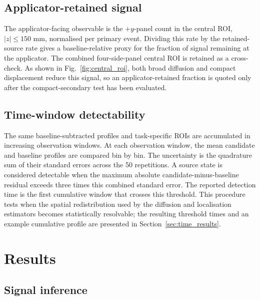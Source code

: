 \documentclass{iopconfser}
\begin{document}
\subsection{Applicator-retained signal}

The applicator-facing observable is the \(+y\)-panel count in the central
ROI, \(|z|\leq150\) mm, normalised per primary event. Dividing this rate by
the retained-source rate gives a baseline-relative proxy for the fraction of
signal remaining at the applicator. The combined four-side-panel central ROI is retained as a
cross-check. As shown in Fig.~\ref{fig:central_roi}, both broad diffusion and
compact displacement reduce this signal, so an applicator-retained fraction
is quoted only after the compact-secondary test has been evaluated.


\subsection{Time-window detectability}

The same baseline-subtracted profiles and task-specific ROIs are accumulated
in increasing observation windows. At each observation window, the mean
candidate and baseline profiles are compared bin by bin. The uncertainty is
the quadrature sum of their standard errors across the 50 repetitions. A
source state is considered detectable when the maximum absolute
candidate-minus-baseline residual exceeds three times this combined standard
error. The reported detection time is the first cumulative window that
crosses this threshold. This procedure tests when the spatial redistribution
used by the diffusion and localisation estimators becomes statistically
resolvable; the resulting threshold times and an example cumulative profile
are presented in Section~\ref{sec:time_results}.

\section{Results}

\subsection{Signal inference}
\end{document}
